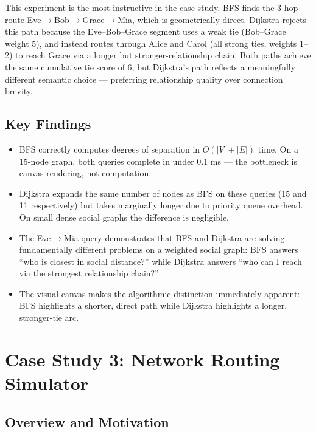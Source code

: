 \documentclass[12pt, a4paper, oneside]{report}
\theoremstyle{definition}
\begin{document}
This experiment is the most instructive in the case study. BFS finds the 3-hop route Eve$\to$Bob$\to$Grace$\to$Mia, which is geometrically direct. Dijkstra rejects this path because the Eve--Bob--Grace segment uses a weak tie (Bob--Grace weight 5), and instead routes through Alice and Carol (all strong ties, weights 1--2) to reach Grace via a longer but stronger-relationship chain. Both paths achieve the same cumulative tie score of 6, but Dijkstra's path reflects a meaningfully different semantic choice — preferring relationship quality over connection brevity.

\section{Key Findings}

\begin{itemize}
    \item BFS correctly computes degrees of separation in $O(|V|+|E|)$ time. On a 15-node graph, both queries complete in under 0.1 ms — the bottleneck is canvas rendering, not computation.
    \item Dijkstra expands the same number of nodes as BFS on these queries (15 and 11 respectively) but takes marginally longer due to priority queue overhead. On small dense social graphs the difference is negligible.
    \item The Eve$\to$Mia query demonstrates that BFS and Dijkstra are solving fundamentally different problems on a weighted social graph: BFS answers ``who is closest in social distance?'' while Dijkstra answers ``who can I reach via the strongest relationship chain?''
    \item The visual canvas makes the algorithmic distinction immediately apparent: BFS highlights a shorter, direct path while Dijkstra highlights a longer, stronger-tie arc.
\end{itemize}

\chapter{Case Study 3: Network Routing Simulator}

\section{Overview and Motivation}
\end{document}
